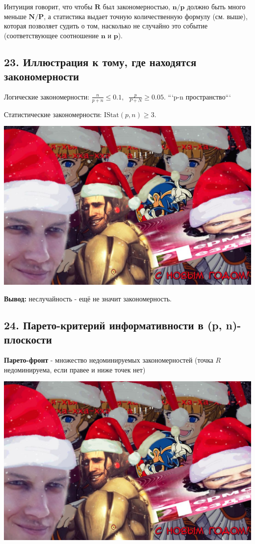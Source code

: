 Интуиция говорит, что чтобы $\mathbf{R}$ был закономерностью,
$\mathbf{n/p}$ должно быть много меньше $\mathbf{N/P}$, а статистика выдает
точную количественную формулу (см. выше), которая позволяет судить о том,
насколько не случайно это событие (соответствующее соотношение $\mathbf{n}$
и $\mathbf{p}$).

\subsection{23. Иллюстрация к тому, где находятся закономерности}

Логические закономерности:
$\frac{n}{p+n} \leqslant 0.1, \;\; \frac{p}{P+N} \geqslant 0.05$.
```p-n пространство```

Статистические закономерности:
$\text{IStat}{\left(p, n\right)} \geqslant 3$.

\includegraphics[scale=0.3]{figures/samplefigure.jpg}

\textbf{Вывод:} неслучайность - ещё не значит закономерность.

\subsection{24. Парето-критерий информативности в (p, n)-плоскости}

\textbf{Парето-фронт} - множество недоминируемых закономерностей (точка $R$
недоминируема, если правее и ниже точек нет)

\includegraphics[scale=0.3]{figures/samplefigure.jpg}


